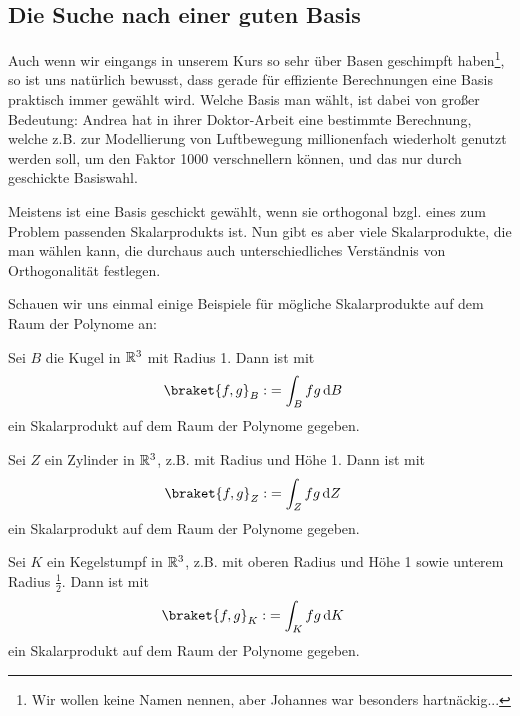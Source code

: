 \subsection{Die Suche nach einer guten Basis}
Auch wenn wir eingangs in unserem Kurs so sehr über Basen geschimpft haben\footnote{Wir wollen keine Namen nennen, aber Johannes war besonders hartnäckig...}, so ist uns natürlich bewusst, dass gerade für effiziente Berechnungen eine Basis praktisch immer gewählt wird. Welche Basis man wählt, ist dabei von großer Bedeutung: Andrea hat in ihrer Doktor-Arbeit eine bestimmte Berechnung, welche z.B. zur Modellierung von Luftbewegung millionenfach wiederholt genutzt werden soll, um den Faktor 1000 verschnellern können, und das nur durch geschickte Basiswahl. 

\begin{remark}
	Meistens ist eine Basis geschickt gewählt, wenn sie orthogonal bzgl. eines zum Problem passenden Skalarprodukts ist. Nun gibt es aber viele Skalarprodukte, die man wählen kann, die durchaus auch unterschiedliches Verständnis von Orthogonalität festlegen.
\end{remark}
Schauen wir uns einmal einige Beispiele für mögliche Skalarprodukte auf dem Raum der Polynome an:
\begin{example}
	Sei $B$ die Kugel in $\mathbb{R}^3$ mit Radius 1. Dann ist mit
	\begin{align*}
		\braket{f,g}_B :&= \int_B f g \dd B
	\end{align*}
	ein Skalarprodukt auf dem Raum der Polynome gegeben.
\end{example}

\begin{example}
	Sei $Z$ ein Zylinder in $\mathbb{R}^3$, z.B. mit Radius und Höhe 1. Dann ist mit
	\begin{align*}
		\braket{f,g}_Z :&= \int_Z f g \dd Z
	\end{align*}
	ein Skalarprodukt auf dem Raum der Polynome gegeben.
\end{example}

\begin{example}
	Sei $K$ ein Kegelstumpf in $\mathbb{R}^3$, z.B. mit oberen Radius und Höhe 1 sowie unterem Radius $\frac{1}{2}$. Dann ist mit
	\begin{align*}
		\braket{f,g}_K :&= \int_K f g \dd K
	\end{align*}
	ein Skalarprodukt auf dem Raum der Polynome gegeben.
\end{example}

